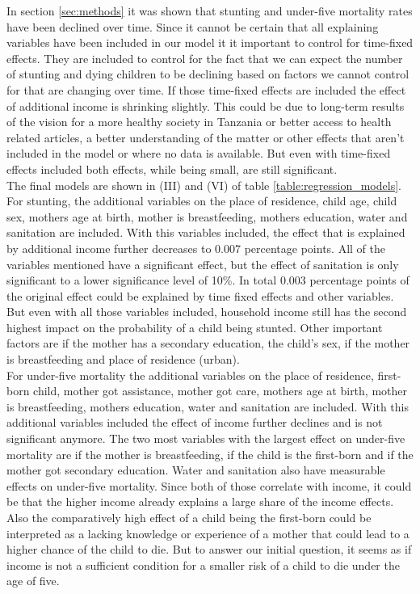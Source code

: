 \documentclass[a4paper, 11pt]{article} %
\begin{document}
In section \ref{sec:methods} it was shown that stunting and under-five mortality rates have been declined over time. Since it cannot be certain that all explaining variables have been included in our model it it important to control for time-fixed effects. They are included to control for the fact that we can expect the number of stunting and dying children to be declining based on factors we cannot control for that are changing over time. If those time-fixed effects are included the effect of additional income is shrinking slightly. This could be due to long-term results of the vision for a more healthy society in Tanzania or better access to health related articles, a better understanding of the matter or other effects that aren't included in the model or where no data is available. But even with time-fixed effects included both effects, while being small, are still significant. \\

The final models are shown in (III) and (VI) of table \ref{table:regression_models}. For stunting, the additional variables on the place of residence, child age, child sex, mothers age at birth, mother is breastfeeding, mothers education, water and sanitation are included. With this variables included, the effect that is explained by additional income further decreases to 0.007 percentage points. All of the variables mentioned have a significant effect, but the effect of sanitation is only significant to a lower significance level of 10\%. In total 0.003 percentage points of the original effect could be explained by time fixed effects and other variables. But even with all those variables included, household income still has the second highest impact on the probability of a child being stunted. Other important factors are if the mother has a secondary education, the child's sex, if the mother is breastfeeding and place of residence (urban).  \\

For under-five mortality the additional variables on the place of residence, first-born child, mother got assistance, mother got care, mothers age at birth, mother is breastfeeding, mothers education, water and sanitation are included. With this additional variables included the effect of income further declines and is not significant anymore. The two most variables with the largest effect on under-five mortality are if the mother is breastfeeding, if the child is the first-born and if the mother got secondary education. Water and sanitation also have measurable effects on under-five mortality. Since both of those correlate with income, it could be that the higher income already explains a large share of the income effects. Also the comparatively high effect of a child being the first-born could be interpreted as a lacking knowledge or experience of a mother that could lead to a higher chance of the child to die. But to answer our initial question, it seems as if income is not a sufficient condition for a smaller risk of a child to die under the age of five.
\end{document}
